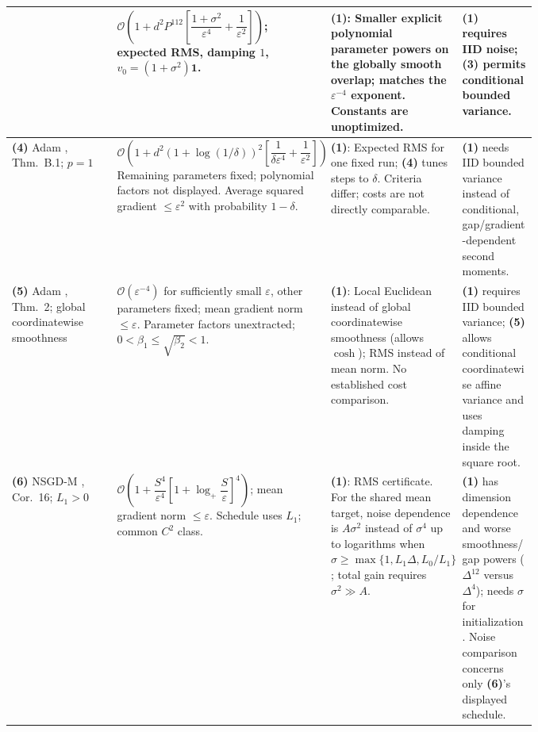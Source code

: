 \begin{table}[tp]
\begin{threeparttable}
\begin{tabularx}{\linewidth}{@{}>{\raggedright\arraybackslash}p{0.20\linewidth}>{\raggedright\arraybackslash}p{0.32\linewidth}>{\raggedright\arraybackslash}p{0.25\linewidth}>{\raggedright\arraybackslash}X@{}}
& $\mathcal{O}\!\left(1+d^2P^{112}\left[\dfrac{1+\sigma^2}{\varepsilon^4}+\dfrac1{\varepsilon^2}\right]\right)$; expected RMS, damping $1$, $v_0=(1+\sigma^2)\mathbf1$.
& \textbf{(1)}: Smaller explicit polynomial parameter powers on the globally smooth overlap; matches the $\varepsilon^{-4}$ exponent. Constants are unoptimized.
& \textbf{(1)} requires IID noise; \textbf{(3)} permits conditional bounded variance. \\
\midrule
\textbf{(4)} Adam \citep{gsaJin2026v2}, Thm.~B.1; $p=1$
& $\mathcal{O}\!\left(1+d^2(1+\log(1/\delta))^2\left[\dfrac1{\delta\varepsilon^4}+\dfrac1{\varepsilon^2}\right]\right)$ Remaining parameters fixed; polynomial factors not displayed. Average squared gradient $\le\varepsilon^2$ with probability $1-\delta$.
& \textbf{(1)}: Expected RMS for one fixed run; \textbf{(4)} tunes steps to $\delta$. Criteria differ; costs are not directly comparable.
& \textbf{(1)} needs IID bounded variance instead of conditional, gap/gradient-dependent second moments. \\
\midrule
\textbf{(5)} Adam \citep{gsaZhang2025v3}, Thm.~2; global coordinatewise smoothness
& $\mathcal{O}(\varepsilon^{-4})$ for sufficiently small $\varepsilon$, other parameters fixed; mean gradient norm $\le\varepsilon$. Parameter factors unextracted; $0<\beta_1\le\sqrt{\beta_2}<1$.
& \textbf{(1)}: Local Euclidean instead of global coordinatewise smoothness (allows $\cosh$); RMS instead of mean norm. No established cost comparison.
& \textbf{(1)} requires IID bounded variance; \textbf{(5)} allows conditional coordinatewise affine variance and uses damping inside the square root. \\
\midrule
\textbf{(6)} NSGD-M \citep{gsaHubler2024}, Cor.~16; $L_1>0$
& $\mathcal{O}\!\left(1+\dfrac{S^4}{\varepsilon^4}\left[1+\log_+\dfrac S\varepsilon\right]^4\right)$; mean gradient norm $\le\varepsilon$. Schedule uses $L_1$; common $C^2$ class.
& \textbf{(1)}: RMS certificate. For the shared mean target, noise dependence is $A\sigma^2$ instead of $\sigma^4$ up to logarithms when $\sigma\ge\max\{1,L_1\Delta,L_0/L_1\}$; total gain requires $\sigma^2\gg A$.
& \textbf{(1)} has dimension dependence and worse smoothness/gap powers ($\Delta^{12}$ versus $\Delta^4$); needs $\sigma$ for initialization. Noise comparison concerns only \textbf{(6)}'s displayed schedule. \\
\bottomrule
\end{tabularx}
\begin{tablenotes}[flushleft]\footnotesize

\end{tablenotes}
\end{threeparttable}
\end{table}

